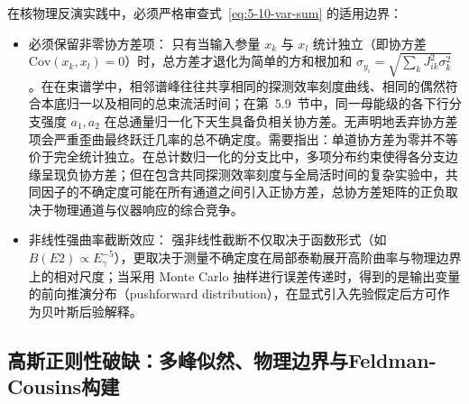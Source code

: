 在核物理反演实践中，必须严格审查式~\eqref{eq:5-10-var-sum} 的适用边界：
\begin{itemize}
\item 必须保留非零协方差项：
只有当输入参量 $x_k$ 与 $x_l$ 统计独立（即协方差 $\mathrm{Cov}(x_k, x_l) = 0$）时，总方差才退化为简单的方和根加和 $\sigma_{y_i} = \sqrt{\sum_k J_{ik}^2 \sigma_k^2}$。在在束谱学中，相邻谱峰往往共享相同的探测效率刻度曲线、相同的偶然符合本底归一以及相同的总束流活时间；在第~5.9~节中，同一母能级的各下行分支强度 $a_1, a_2$ 在总通量归一化下天生具备负相关协方差。无声明地丢弃协方差项会严重歪曲最终跃迁几率的总不确定度。需要指出：单道协方差为零并不等价于完全统计独立。在总计数归一化的分支比中，多项分布约束使得各分支边缘呈现负协方差；但在包含共同探测效率刻度与全局活时间的复杂实验中，共同因子的不确定度可能在所有通道之间引入正协方差，总协方差矩阵的正负取决于物理通道与仪器响应的综合竞争。
\item 非线性强曲率截断效应：
强非线性截断不仅取决于函数形式（如 $B(E2) \propto E_\gamma^{-5}$），更取决于测量不确定度在局部泰勒展开高阶曲率与物理边界上的相对尺度；当采用 Monte Carlo 抽样进行误差传递时，得到的是输出变量的前向推演分布（pushforward distribution），在显式引入先验假定后方可作为贝叶斯后验解释。
\end{itemize}

\subsection{高斯正则性破缺：多峰似然、物理边界与Feldman-Cousins构建}\label{subsec:5-10-3}


